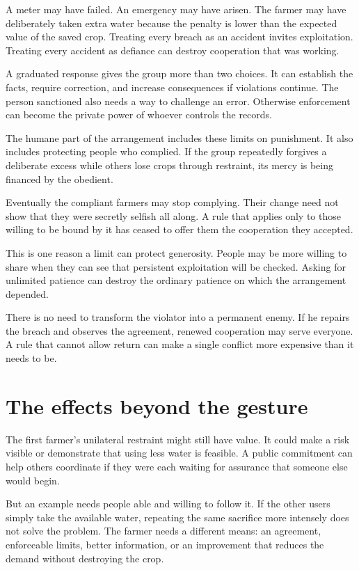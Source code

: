 \documentclass[12pt,a4paper]{book}
\begin{document}
A meter may have failed. An emergency may have arisen. The farmer may have deliberately taken extra water because the penalty is lower than the expected value of the saved crop. Treating every breach as an accident invites exploitation. Treating every accident as defiance can destroy cooperation that was working.

A graduated response gives the group more than two choices. It can establish the facts, require correction, and increase consequences if violations continue. The person sanctioned also needs a way to challenge an error. Otherwise enforcement can become the private power of whoever controls the records.

The humane part of the arrangement includes these limits on punishment. It also includes protecting people who complied. If the group repeatedly forgives a deliberate excess while others lose crops through restraint, its mercy is being financed by the obedient.

Eventually the compliant farmers may stop complying. Their change need not show that they were secretly selfish all along. A rule that applies only to those willing to be bound by it has ceased to offer them the cooperation they accepted.

This is one reason a limit can protect generosity. People may be more willing to share when they can see that persistent exploitation will be checked. Asking for unlimited patience can destroy the ordinary patience on which the arrangement depended.

There is no need to transform the violator into a permanent enemy. If he repairs the breach and observes the agreement, renewed cooperation may serve everyone. A rule that cannot allow return can make a single conflict more expensive than it needs to be.

\section*{The effects beyond the gesture}

The first farmer's unilateral restraint might still have value. It could make a risk visible or demonstrate that using less water is feasible. A public commitment can help others coordinate if they were each waiting for assurance that someone else would begin.

But an example needs people able and willing to follow it. If the other users simply take the available water, repeating the same sacrifice more intensely does not solve the problem. The farmer needs a different means: an agreement, enforceable limits, better information, or an improvement that reduces the demand without destroying the crop.
\end{document}
